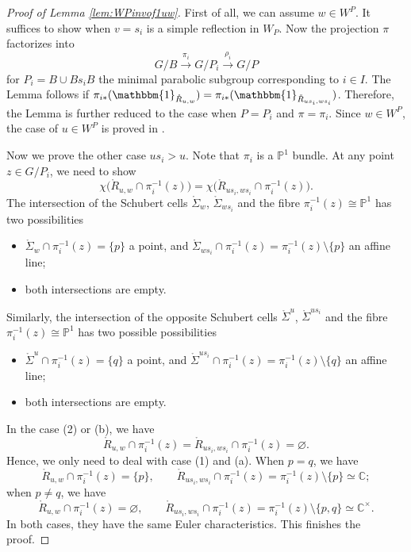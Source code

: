 \documentclass[12pt]{amsart}
\begin{document}
\begin{proof}[Proof of Lemma \ref{lem:WPinvof1uw}]
First of all, we can assume $w\in W^P$.
It suffices to show when $v=s_i$ is a simple reflection in $W_P$. 
Now the projection $\pi$ factorizes into 
$$G/B\stackrel{\pi_i}\longrightarrow G/P_i\stackrel{\rho_i}\longrightarrow G/P$$
for $P_i=B\cup Bs_iB$ the minimal parabolic subgroup corresponding to $i\in I$. The Lemma follows if $\pi_{i*}(\mathbbm{1}_{\mathring{R}_{u,w}})=\pi_{i*}(\mathbbm{1}_{\mathring{R}_{us_i,ws_i}})$. Therefore, the
Lemma is further  reduced to the case when $P=P_i$ and $\pi=\pi_i$. Since $w\in W^P$, the case of $u\in W^P$ is proved in \cite[Lemma 3.1]{KLS-Proj}.

Now we prove the other case $us_i>u$. Note that $\pi_i$ is a $\mathbb{P}^1$ bundle. 
At any point $z\in G/P_i$, we need to show 
$$\chi\big(\mathring{R}_{u,w}\cap \pi_i^{-1}(z)\big)=
\chi\big(\mathring{R}_{us_i,ws_i}\cap \pi_i^{-1}(z)\big).$$
The intersection of the Schubert cells $\mathring{\Sigma}_w$, $\mathring{\Sigma}_{ws_i}$ and the fibre $\pi_i^{-1}(z)\cong \mathbb{P}^1$ has two possibilities
\begin{itemize}
    \item[(1)] $\mathring{\Sigma}_{w} \cap \pi_i^{-1}(z)=\{p\}$ a point, 
    and $\mathring{\Sigma}_{ws_i}\cap \pi_i^{-1}(z)=\pi_i^{-1}(z)\setminus \{p\}$ an affine line; 
    \item[(2)] both intersections are empty.
\end{itemize}
Similarly, the intersection of the opposite Schubert cells $\mathring{\Sigma}^{u}$, $\mathring{\Sigma}^{us_i}$ and the fibre $\pi_i^{-1}(z)\cong \mathbb{P}^1$ has two possible possibilities
\begin{itemize}
    \item[(a)] $\mathring{\Sigma}^{u} \cap \pi_i^{-1}(z)=\{q\}$ a point, and $\mathring{\Sigma}^{us_i}\cap \pi_i^{-1}(z)=\pi_i^{-1}(z)\setminus \{q\}$ an affine line; 
    \item[(b)] both intersections are empty.
\end{itemize}
In the case (2) or (b), we have 
$$\mathring{R}_{u,w} \cap \pi_i^{-1}(z)=\mathring{R}_{us_i,ws_i} \cap \pi_i^{-1}(z)=\varnothing. $$
Hence, we only need to deal with case (1) and (a). When $p=q$, we have 
$$
\mathring{R}_{u,w} \cap \pi_i^{-1}(z)=\{p\},\qquad 
\mathring{R}_{us_i,ws_i} \cap \pi_i^{-1}(z)=\pi_i^{-1}(z)\setminus \{p\}\simeq \mathbb{C};$$
when $p\neq q$, we have 
$$
\mathring{R}_{u,w} \cap \pi_i^{-1}(z)=\varnothing,\qquad 
\mathring{R}_{us_i,ws_i} \cap \pi_i^{-1}(z)=\pi_i^{-1}(z)\setminus \{p,q\}\simeq \mathbb{C}^\times.$$
In both cases, they have the same Euler characteristics. 
This finishes the proof. 
\end{proof}
\end{document}
